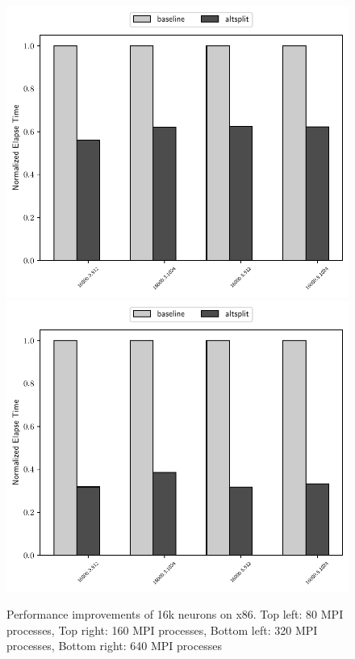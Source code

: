 \begin{figure}[H]
{        \includegraphics[scale=0.55]{altsplit/figs/mn4/16000_avgs_320.pdf}
        \includegraphics[scale=0.55]{altsplit/figs/mn4/16000_avgs_640.pdf}
    }
    \caption{Performance improvements of 16k neurons on x86. Top left: 80 MPI 
    processes, Top right: 160 MPI processes, Bottom left: 320 MPI processes, 
    Bottom right: 640 MPI processes}
    \label{fig:altsplit_16k_mn4}
\end{figure}

